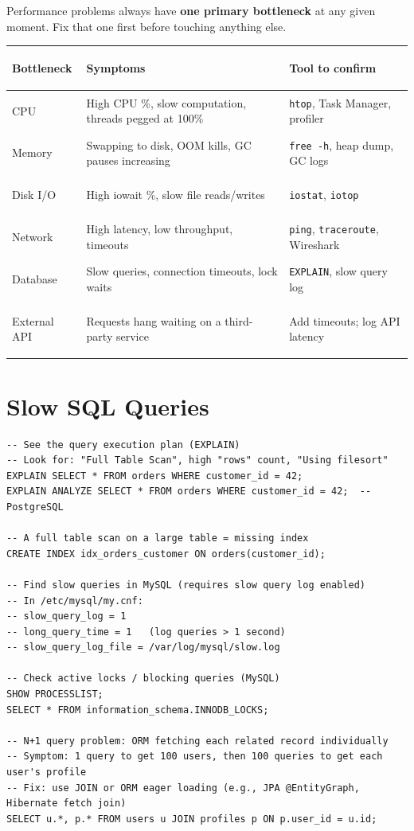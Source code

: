 \documentclass[11pt, letterpaper]{article}
\begin{document}
Performance problems always have \textbf{one primary bottleneck} at any given moment. Fix that one first before touching anything else.

\noindent
{\renewcommand{\arraystretch}{1.6}
\begin{tabularx}{\textwidth}{>{\bfseries\raggedright\arraybackslash}p{3cm}
                              >{\raggedright\arraybackslash}X
                              >{\raggedright\arraybackslash}p{3.5cm}}
\toprule
\rowcolor{tableheaderorange}
\textbf{Bottleneck} & \textbf{Symptoms} & \textbf{Tool to confirm} \\
\midrule
\rowcolor{rowOr} CPU     & High CPU \%, slow computation, threads pegged at 100\% & \texttt{htop}, Task Manager, profiler \\
\rowcolor{rowA}  Memory  & Swapping to disk, OOM kills, GC pauses increasing & \texttt{free -h}, heap dump, GC logs \\
\rowcolor{rowOr} Disk I/O & High iowait \%, slow file reads/writes & \texttt{iostat}, \texttt{iotop} \\
\rowcolor{rowA}  Network  & High latency, low throughput, timeouts & \texttt{ping}, \texttt{traceroute}, Wireshark \\
\rowcolor{rowOr} Database & Slow queries, connection timeouts, lock waits & \texttt{EXPLAIN}, slow query log \\
\rowcolor{rowA}  External API & Requests hang waiting on a third-party service & Add timeouts; log API latency \\
\bottomrule
\end{tabularx}}

\section*{Slow SQL Queries}

\begin{lstlisting}[style=shell, caption={Diagnosing slow queries in MySQL/PostgreSQL}]
-- See the query execution plan (EXPLAIN)
-- Look for: "Full Table Scan", high "rows" count, "Using filesort"
EXPLAIN SELECT * FROM orders WHERE customer_id = 42;
EXPLAIN ANALYZE SELECT * FROM orders WHERE customer_id = 42;  -- PostgreSQL

-- A full table scan on a large table = missing index
CREATE INDEX idx_orders_customer ON orders(customer_id);

-- Find slow queries in MySQL (requires slow query log enabled)
-- In /etc/mysql/my.cnf:
-- slow_query_log = 1
-- long_query_time = 1   (log queries > 1 second)
-- slow_query_log_file = /var/log/mysql/slow.log

-- Check active locks / blocking queries (MySQL)
SHOW PROCESSLIST;
SELECT * FROM information_schema.INNODB_LOCKS;

-- N+1 query problem: ORM fetching each related record individually
-- Symptom: 1 query to get 100 users, then 100 queries to get each user's profile
-- Fix: use JOIN or ORM eager loading (e.g., JPA @EntityGraph, Hibernate fetch join)
SELECT u.*, p.* FROM users u JOIN profiles p ON p.user_id = u.id;
\end{lstlisting}
\end{document}
